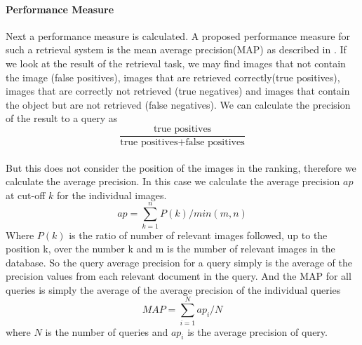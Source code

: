 \documentclass[10pt,a4paper]{article}
\begin{document}
\paragraph{Performance Measure}
Next a performance measure is calculated. A proposed performance measure for such a retrieval system is the mean average precision(MAP) as described in \cite{philbin}. If we look at the result of the retrieval task, we may find images that not contain the image (false positives), images that are retrieved correctly(true positives), images that are correctly not retrieved (true negatives) and images that contain the object but are not retrieved (false negatives). We can calculate the precision of the result to a query as 
$$\frac{\text{true positives}}{\text{true positives+false positives}}$$
\\
But this does not consider the position of the images in the ranking, therefore we calculate the average precision. In this case we calculate the average precision $ap$  at cut-off $k$ for the individual images.
$$ap=\sum_{k=1}^n P(k)/min(m,n)$$
Where $P(k)$ is the ratio of number of relevant images followed, up to the position k, over the number k and m is the number of relevant images in the database. So the query average precision for a query simply is the average of the precision values from each relevant document in the query. And the MAP for all queries is simply the average of the average precision of the individual queries
$$MAP = \sum_{i=1}^Nap_i/N$$
where $N$ is the number of queries and $ap_i$ is the average precision of query.
\end{document}
